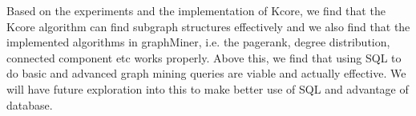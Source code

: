 Based on the experiments and the implementation of Kcore, we find that the Kcore algorithm can find subgraph structures effectively and we also find that the implemented algorithms in graphMiner, i.e. the pagerank, degree distribution, connected component etc works properly. 
Above this, we find that using SQL to do basic and advanced graph mining queries are viable and actually effective. We will
have future exploration into this to make better use of SQL and advantage of database.

